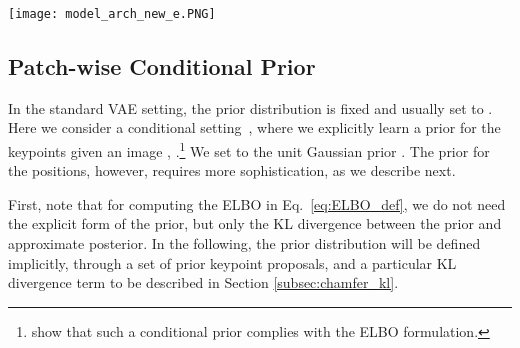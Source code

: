 \documentclass[nohyperref]{article}
\theoremstyle{plain}
\theoremstyle{definition}
\theoremstyle{remark}
\begin{document}
\begin{center}
\begin{figure*}
\centering
    \texttt{[image: model\_arch\_new\_e.PNG]}
    \vspace{-1.0em}
\caption{DLP architecture. Image is processed by the position encoder to produce the posterior probability of latent particle positions. These positions are used to extract glimpses from the original images using a STN, which are then processed by an appearance encoder to produce the appearance features for each particle. The input image (or an augmented view of it) is also processed by the prior network, producing keypoint proposals via SSM. To reconstruct the image, the particles are (1) transformed to differentiable Gaussian heatmaps and (2) go through a PointNet++ to produce feature maps . For the \texttt{Masked} model, the heatmaps are used as binary masks to combine local regions from  with bypass features from the encoder. 
For the \texttt{Object} model, a separate glimpse decoder is used to decode RGBA patches, which are then combined with feature maps  to produce the output image. See text for full details.}
\label{fig:vae_arch}
    \vspace{-1em}
\end{figure*}
\end{center}

\vspace{-3em}
\subsection{Patch-wise Conditional Prior}
In the standard VAE setting, the prior distribution is fixed and usually set to . Here we consider a conditional setting~\citep{Sohn2015cvae}, where we explicitly learn a prior for the keypoints given an image , .\footnote{ \citet{Sohn2015cvae} show that such a conditional prior complies with the ELBO formulation.} We set  to the unit Gaussian prior . The prior for the positions, however, requires more sophistication, as we describe next.

First, note that for computing the ELBO in Eq.~\eqref{eq:ELBO_def}, we do not need the explicit form of the prior, but only the KL divergence between the prior and approximate posterior. In the following, the prior distribution will be defined implicitly, through a set of prior keypoint proposals, and a particular KL divergence term to be described in Section \ref{subsec:chamfer_kl}.
\end{document}
